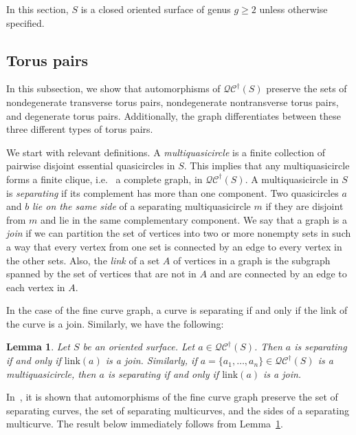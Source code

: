 \documentclass[12pt,a4paper]{amsart}
\theoremstyle{definition}
\theoremstyle{plain}
\newtheorem{lemma}[theorem]{Lemma}
\numberwithin{equation}{section}
\newcommand{\qcg}{\mathcal{QC}^{\dagger}}
\begin{document}
In this section, $S$ is a closed oriented surface of genus $g \geq 2$ unless otherwise specified.

\subsection{Torus pairs}\label{Subsect:torus}
In this subsection, we show that automorphisms of $\qcg(S)$ preserve the sets of nondegenerate transverse torus pairs, nondegenerate nontransverse torus pairs, and degenerate torus pairs. Additionally, the graph differentiates between these three different types of torus pairs.

We start with relevant definitions. A \textit{multiquasicircle} is a finite collection of pairwise disjoint essential  quasicircles in $S$.
This implies that any multiquasicircle forms a finite clique, i.e.~ a complete graph, in $\qcg(S)$. 
A multiquasicircle in $S$ is \textit{separating} if its complement has more than one component. 
Two quasicircles $a$ and $b$ \textit{lie on the same side} of a separating multiquasicircle $m$ if they are disjoint from $m$ and lie in the same complementary component.
We say that a graph is a \textit{join} if we can partition the set of vertices into two or more nonempty sets in such a way that every vertex from one set is connected by an edge to every vertex in the other sets. 
Also, the \textit{link} of a set $A$ of vertices in a graph is the subgraph spanned by the set of vertices that are not in $A$ and are connected by an edge to each vertex in $A$.

In the case of the fine curve graph, a curve is separating if and only if the link of the curve is a join. Similarly, we have the following:

\begin{lemma}\label{Lem:SeparatingLinkJoin}
     Let $S$ be an oriented surface. Let $a \in \qcg(S)$. Then $a$ is separating if and only
    if $\mathrm{link}(a)$ is a join.
    Similarly, if $ a = \{a_1, \ldots, a_n\} \in \qcg(S)$ is a multiquasicircle, then $a$ is separating if and only
    if $\mathrm{link}(a)$ is a join.
\end{lemma}



In~\cite{long2023automorphisms}, it is shown that automorphisms of the fine curve graph preserve the set of separating curves, the set of separating multicurves, and the sides of a separating multicurve.
The result below immediately follows from Lemma~\ref{Lem:SeparatingLinkJoin}.
\end{document}
